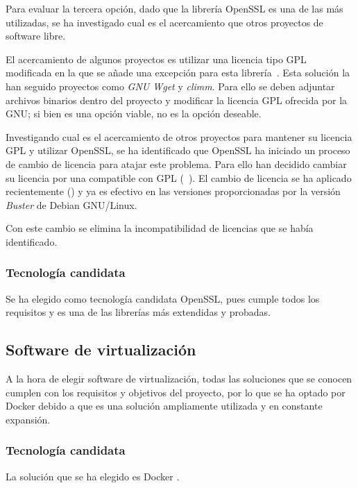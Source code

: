 \par Para evaluar la tercera opción, dado que la librería OpenSSL es una de las más utilizadas, se ha investigado cual es el acercamiento que otros proyectos de software libre.
\par El acercamiento de algunos proyectos es utilizar una licencia tipo GPL modificada en la que se añade una excepción para esta librería~\cite{opensslexception}. Esta solución la han seguido proyectos como {\em GNU Wget} y {\em climm}. Para
ello se deben adjuntar archivos binarios dentro del proyecto y modificar la licencia GPL ofrecida por la GNU; si bien es una opción viable, no es la opción deseable.
\par Investigando cual es el acercamiento de otros proyectos para mantener su licencia GPL y utilizar OpenSSL, se ha identificado que OpenSSL ha iniciado un proceso de cambio de licencia para atajar este problema. Para ello han decidido
cambiar su licencia por una compatible con GPL (~\cite[Anuncio del cambio de licencia]{opensslannouncement}). El cambio de licencia se ha aplicado recientemente (\cite[{\em Pull request} del cambio]{opensslpullrequest}) y ya es efectivo en las
versiones proporcionadas por la versión {\em Buster} de Debian GNU/Linux.
\par Con este cambio se elimina la incompatibilidad de licencias que se había identificado.

\subsubsection{Tecnología candidata}
\par Se ha elegido como tecnología candidata OpenSSL, pues cumple todos los requisitos y es una de las librerías más extendidas y probadas.

\subsection{Software de virtualización}
\par A la hora de elegir software de virtualización, todas las soluciones que se conocen cumplen con los requisitos y objetivos del proyecto, por lo que se ha optado por Docker debido a que es una solución ampliamente utilizada y en constante
expansión.

\subsubsection{Tecnología candidata}
\par La solución que se ha elegido es Docker \cite{docker}.

